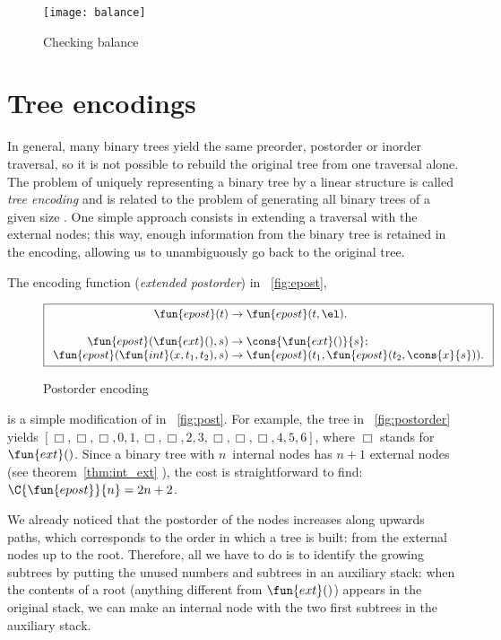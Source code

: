 \begin{figure}[h]
\centering
\texttt{[image: balance]}
\caption{Checking balance}
\label{fig:balance}
\end{figure}

\section{Tree encodings}

In general, many binary trees yield the same preorder, postorder or
inorder traversal, so it is not possible to rebuild the original tree
from one traversal alone. The problem of uniquely representing a
binary tree by a linear structure is called \emph{tree
  encoding} \citep{Makinen_1991} and is related to the problem of
generating all binary trees of a given
size \citep[7.2.1.6]{Knuth_2011}. One simple approach consists in
extending a traversal with the external nodes; this way, enough
information from the binary tree is retained in the encoding, allowing
us to unambiguously go back to the original tree.

The encoding function
(\emph{extended postorder}) in
\fig~\vref{fig:epost},
\begin{figure}
\begin{equation*}
\boxed{
\begin{array}{r@{\;}c@{\;}l}
\fun{epost}(t) & \rightarrow & \fun{epost}(t,\el).\\
\\
\fun{epost}(\fun{ext}(),s) & \rightarrow
  & \cons{\fun{ext}()}{s};\\
\fun{epost}(\fun{int}(x,t_1,t_2),s) & \rightarrow
  & \fun{epost}(t_1,\fun{epost}(t_2,\cons{x}{s})).
\end{array}}
\end{equation*}
\caption{Postorder encoding}
\label{fig:epost}
\end{figure}
is a simple modification of  in
\fig~\vref{fig:post}. For example, the tree in
\fig~\vref{fig:postorder} yields \([\Box, \Box, \Box, 0, 1, \Box,
\Box, 2, 3, \Box, \Box, \Box, 4, 5, 6]\), where \(\Box\) stands for
\(\fun{ext}()\). Since a binary tree with \(n\)~internal nodes has
\(n+1\) external nodes (see theorem~\ref{thm:int_ext}
), the cost is straightforward to find:
\(\C{\fun{epost}}{n} = 2n + 2\).

We already noticed that the postorder of the nodes increases along
upwards paths, which corresponds to the order in which a tree is
built: from the external nodes up to the root. Therefore, all we have
to do is to identify the growing subtrees by putting the unused
numbers and subtrees in an auxiliary stack: when the contents of a
root (anything different from \(\fun{ext}()\)) appears in the original
stack, we can make an internal node with the two first subtrees in the
auxiliary stack.

